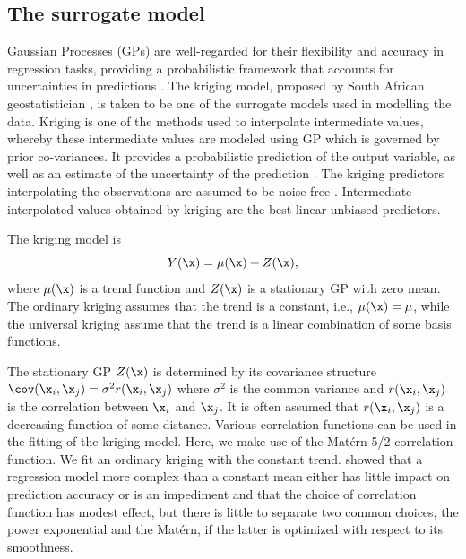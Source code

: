\documentclass [PhD] {package/uclathes}
\begin{document}
\subsection{The surrogate model}
Gaussian Processes (GPs) are well-regarded for their flexibility and accuracy in regression tasks, providing a probabilistic framework that accounts for uncertainties in predictions \parencite{snelson2008flexible}. The kriging model, proposed by South African geostatistician \textcite{krige1951statistical}, is taken to be one of the surrogate models used in modelling the data. Kriging is one of the methods used to interpolate intermediate values, whereby these intermediate values are modeled using  GP which is governed by prior co-variances.  It provides a probabilistic prediction of the output variable, as well as an estimate of the uncertainty of the prediction \parencite{chevalier2014kriginv}. The kriging predictors interpolating the observations are assumed to be noise-free \parencite{roustant2012dicekriging}. Intermediate interpolated values obtained by kriging are the best linear unbiased predictors. %

The  kriging model is
\begin{equation*}\label{eq:SK}
      Y(\x) = \mu(\x) + Z(\x),
\end{equation*}
where $\mu(\x)$ is a trend function and \(Z(\x)\) is a stationary GP with zero mean.
The ordinary kriging  assumes that the trend is a constant, i.e.,  $\mu(\x)=\mu$, while the universal kriging assume that the trend is a linear combination of some basis functions.

The stationary GP $Z(\x)$ is determined by its covariance structure $\cov(\x_i, \x_j) = \sigma^2 r(\x_i, \x_j)$ where $\sigma^2$ is the common variance and $r(\x_i, \x_j)$ is the correlation between $\x_i$ and $\x_j$. It is often assumed that $r(\x_i, \x_j)$ is a decreasing function of some distance. Various correlation functions can be used in the fitting of the kriging model. Here, we make use of the Mat\'ern 5/2 correlation function. We fit an ordinary kriging with the constant trend.  \textcite{chen2016analysis} showed that a regression model more complex than a constant mean either has little impact on prediction accuracy or is an impediment and that the choice of correlation function has modest effect, but there is little to separate two common choices, the power exponential and the Mat\'ern, if the latter is optimized with respect to its smoothness.
\end{document}
